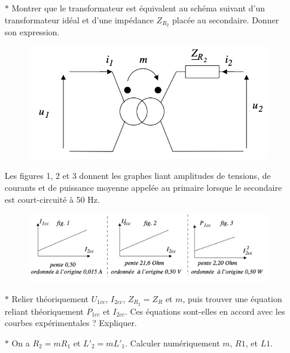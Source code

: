 \documentclass{report}
\begin{document}
\begin{itemize}
	
	\item[$\ast$] Montrer que le transformateur est équivalent au schéma suivant d’un transformateur idéal et d’une impédance $Z_{R_2}$ placée au secondaire. Donner son expression.
	
\begin{figure}[h!]
	\centering
		\includegraphics[scale=0.45]{transfo_reel2.png}
\end{figure}		
	
Les figures 1, 2 et 3 donnent les graphes liant amplitudes de tensions, de courants et de puissance moyenne appelée au primaire lorsque le secondaire est court-circuité à 50 Hz.	
	
\begin{figure}[h!]
	\centering
		\includegraphics[scale=0.45]{courbe_transfo_reel.png}
\end{figure}		

	\item[$\ast$] Relier théoriquement $U_{1cc}$, $I_{2cc}$, $Z_{R_2}=Z_R$ et $m$, puis trouver une équation reliant théoriquement $P_{1cc}$ et $I_{2cc}$. Ces équations sont-elles en accord avec les courbes expérimentales ? Expliquer.

	\item[$\ast$] On a $R_2 =m R_1$ et $L'_2 =m L'_1$. Calculer numériquement $m$, $R1$, et $L1$.

\end{itemize}
\end{document}
